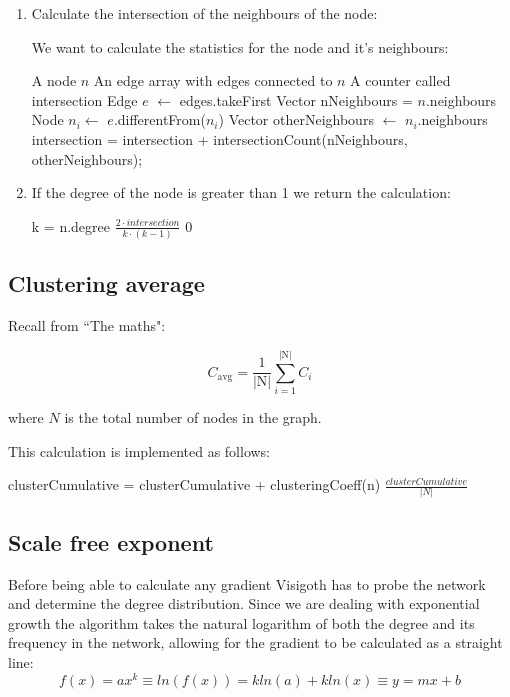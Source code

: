 \documentclass[a4paper,11pt,titlepage]{article}
\begin{document}
\begin{enumerate}
\item Calculate the intersection of the neighbours of the node:

We want to calculate the statistics for the node and it's neighbours:

\begin{algorithmic}
  \REQUIRE A node $n$
  \REQUIRE An edge array with edges connected to $n$
  \REQUIRE A counter called intersection
    \STATE Edge $e$ $\gets$ edges.takeFirst
    \STATE Vector nNeighbours = $n$.neighbours
    \STATE Node $n_i \gets$ $e$.differentFrom($n_i$)
    \STATE Vector otherNeighbours $\gets$ $n_i$.neighbours
    \STATE intersection = intersection + intersectionCount(nNeighbours, otherNeighbours);
  \ENDWHILE
\end{algorithmic}

\item If the degree of the node is greater than 1 we return the calculation:

\begin{algorithmic}
  \REQUIRE k = n.degree
    \RETURN $\frac{2 \cdot intersection}{k \cdot (k-1)}$
  \ELSE
    \RETURN $0$
  \ENDIF
\end{algorithmic}

\end{enumerate}

\subsection{Clustering average}

Recall from ``The maths":

\[ C_\mathrm{avg} =
   \frac{1}{\mathrm{|N|}}\sum_{i=1}^{\mathrm{|N|}} C_i
\]

\noindent where \(N\) is the total number of nodes in the graph.

This calculation is implemented as follows:

\begin{algorithmic}
    \STATE clusterCumulative = clusterCumulative + clusteringCoeff(n)
  \ENDFOR
  \RETURN $\frac{clusterCumulative}{|N|}$
\end{algorithmic}


\subsection{Scale free exponent}
Before being able to calculate any gradient Visigoth has to probe the network
and determine the degree distribution. Since we are dealing with exponential
growth the algorithm takes the natural logarithm of both the degree and its
frequency in the network, allowing for the gradient to be calculated as a
straight line:
\[ f(x) = ax^k \equiv ln(f(x)) = kln(a) + kln(x) \equiv y = mx + b \]
\end{document}
